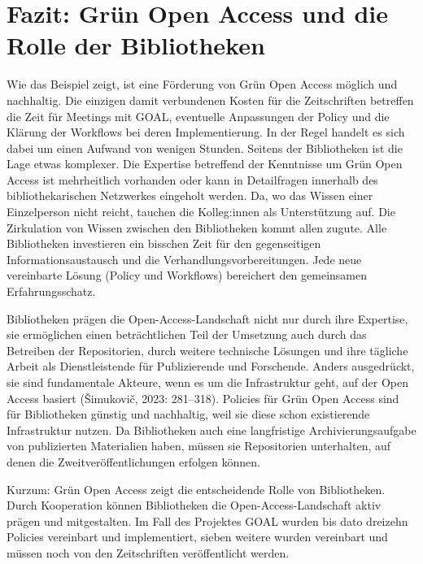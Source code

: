 \documentclass[a4paper,
fontsize=11pt,
oneside,
numbers=noperiodatend,
parskip=half-,
bibliography=totoc,
final
]{scrartcl}
\begin{document}
\hypertarget{fazit-gruxfcn-open-access-und-die-rolle-der-bibliotheken}{%
\section{Fazit: Grün Open Access und die Rolle der
Bibliotheken}\label{fazit-gruxfcn-open-access-und-die-rolle-der-bibliotheken}}

Wie das Beispiel zeigt, ist eine Förderung von Grün Open Access möglich
und nachhaltig. Die einzigen damit verbundenen Kosten für die
Zeitschriften betreffen die Zeit für Meetings mit GOAL, eventuelle
Anpassungen der Policy und die Klärung der Workflows bei deren
Implementierung. In der Regel handelt es sich dabei um einen Aufwand von
wenigen Stunden. Seitens der Bibliotheken ist die Lage etwas komplexer.
Die Expertise betreffend der Kenntnisse um Grün Open Access ist
mehrheitlich vorhanden oder kann in Detailfragen innerhalb des
bibliothekarischen Netzwerkes eingeholt werden. Da, wo das Wissen einer
Einzelperson nicht reicht, tauchen die Kolleg:innen als Unterstützung
auf. Die Zirkulation von Wissen zwischen den Bibliotheken kommt allen
zugute. Alle Bibliotheken investieren ein bisschen Zeit für den
gegenseitigen Informationsaustausch und die Verhandlungsvorbereitungen.
Jede neue vereinbarte Lösung (Policy und Workflows) bereichert den
gemeinsamen Erfahrungsschatz.

Bibliotheken prägen die Open-Access-Landschaft nicht nur durch ihre
Expertise, sie ermöglichen einen beträchtlichen Teil der Umsetzung auch
durch das Betreiben der Repositorien, durch weitere technische Lösungen
und ihre tägliche Arbeit als Dienstleistende für Publizierende und
Forschende. Anders ausgedrückt, sie sind fundamentale Akteure, wenn es
um die Infrastruktur geht, auf der Open Access basiert (Šimukovič, 2023:
281--318). Policies für Grün Open Access sind für Bibliotheken günstig
und nachhaltig, weil sie diese schon existierende Infrastruktur nutzen.
Da Bibliotheken auch eine langfristige Archivierungsaufgabe von
publizierten Materialien haben, müssen sie Repositorien unterhalten, auf
denen die Zweitveröffentlichungen erfolgen können.

Kurzum: Grün Open Access zeigt die entscheidende Rolle von Bibliotheken.
Durch Kooperation können Bibliotheken die Open-Access-Landschaft aktiv
prägen und mitgestalten. Im Fall des Projektes GOAL wurden bis dato
dreizehn Policies vereinbart und implementiert, sieben weitere wurden
vereinbart und müssen noch von den Zeitschriften veröffentlicht werden.
\end{document}

